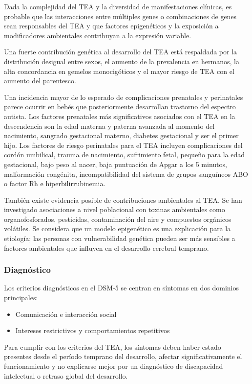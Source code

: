 \documentclass[11pt,letterpaper]{report}
\begin{document}
Dada la complejidad del TEA y la diversidad de manifestaciones clínicas, es
probable que las interacciones entre múltiples genes o combinaciones de genes
sean responsables del TEA y que factores epigenéticos y la exposición a
modificadores ambientales contribuyan a la expresión variable.
\cite{AutismUpToDate}

Una fuerte contribución genética al desarrollo del TEA está respaldada por la
distribución desigual entre sexos, el aumento de la prevalencia en hermanos,
la alta concordancia en gemelos monocigóticos y el mayor riesgo de TEA con el
aumento del parentesco. \cite{AutismUpToDate}

Una incidencia mayor de lo esperado de complicaciones prenatales y perinatales
parece ocurrir en bebés que posteriormente desarrollan trastorno del espectro
autista. Los factores prenatales más significativos asociados con el TEA en la
descendencia son la edad materna y paterna avanzada al momento del nacimiento,
sangrado gestacional materno, diabetes gestacional y ser el primer hijo. Los
factores de riesgo perinatales para el TEA incluyen complicaciones del cordón
umbilical, trauma de nacimiento, sufrimiento fetal, pequeño para la edad
gestacional, bajo peso al nacer, baja puntuación de Apgar a los 5 minutos,
malformación congénita, incompatibilidad del sistema de grupos sanguíneos ABO
o factor Rh e hiperbilirrubinemia. \cite{Boland2021-by}

También existe evidencia posible de contribuciones ambientales al TEA. Se han
investigado asociaciones a nivel poblacional con toxinas ambientales como
organofosforados, pesticidas, contaminación del aire y compuestos orgánicos
volátiles. Se considera que un modelo epigenético es una explicación para la
etiología; las personas con vulnerabilidad genética pueden ser más sensibles a
factores ambientales que influyen en el desarrollo cerebral temprano.
\cite{Nelson58}

\subsubsection{Diagnóstico}
Los criterios diagnósticos en el DSM-5 se centran en síntomas en dos dominios 
principales:
    \begin{itemize}
        \item Comunicación e interacción social
        \item Intereses restrictivos y comportamientos repetitivos
    \end{itemize}
Para cumplir con los criterios del TEA, los síntomas deben haber estado
presentes desde el período temprano del desarrollo, afectar significativamente
el funcionamiento y no explicarse mejor por un diagnóstico de discapacidad
intelectual o retraso global del desarrollo. \cite{DSM5TR}
\end{document}
